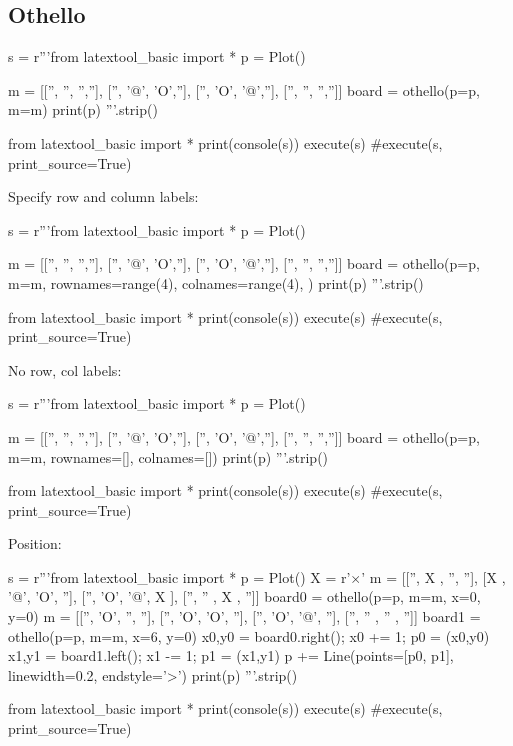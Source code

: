 \subsection{Othello}

\begin{python}
s = r'''from latextool_basic import *
p = Plot()

m = [['', '', '',''],
     ['', '@', 'O',''],
     ['', 'O', '@',''],
     ['', '', '','']]
board = othello(p=p, m=m)
print(p)
'''.strip()

from latextool_basic import *
print(console(s))
execute(s)
#execute(s, print_source=True)
\end{python}


\newpage
Specify row and column labels:

\begin{python}
s = r'''from latextool_basic import *
p = Plot()

m = [['', '', '',''],
     ['', '@', 'O',''],
     ['', 'O', '@',''],
     ['', '', '','']]
board = othello(p=p, m=m,
                rownames=range(4),
                colnames=range(4),
                )
print(p)
'''.strip()

from latextool_basic import *
print(console(s))
execute(s)
#execute(s, print_source=True)
\end{python}


\newpage
No row, col labels:

\begin{python}
s = r'''from latextool_basic import *
p = Plot()

m = [['', '', '',''],
     ['', '@', 'O',''],
     ['', 'O', '@',''],
     ['', '', '','']]
board = othello(p=p, m=m, rownames=[], colnames=[])
print(p)
'''.strip()

from latextool_basic import *
print(console(s))
execute(s)
#execute(s, print_source=True)
\end{python}

\newpage
Position:

\begin{python}
s = r'''from latextool_basic import *
p = Plot()
X = r'$\times$'
m = [['', X  , '',  ''],
     [X , '@', 'O', ''],
     ['', 'O', '@', X ],
     ['', '' , X ,  '']]
board0 = othello(p=p, m=m, x=0, y=0)
m = [['', 'O', '',  ''],
     ['', 'O', 'O', ''],
     ['', 'O', '@', ''],
     ['', '' , '' , '']]
board1 = othello(p=p, m=m, x=6, y=0)
x0,y0 = board0.right(); x0 += 1; p0 = (x0,y0)
x1,y1 = board1.left(); x1 -= 1; p1 = (x1,y1)
p += Line(points=[p0, p1], linewidth=0.2, endstyle='>')
print(p)
'''.strip()

from latextool_basic import *
print(console(s))
execute(s)
#execute(s, print_source=True)
\end{python}




